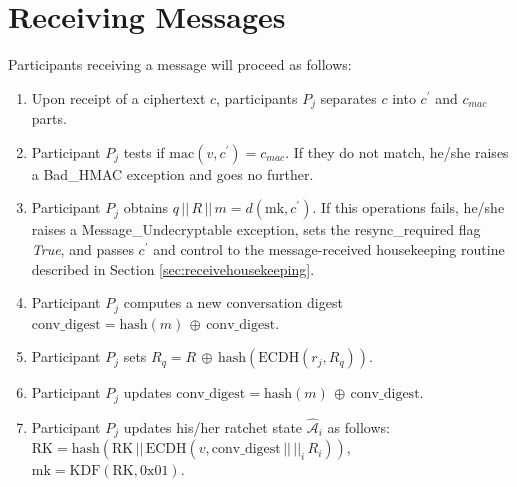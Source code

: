 \documentclass[%
preprint,
amsmath,amssymb,
aps,
prb,
floatfix,
]{revtex4-1}
\begin{document}
\section{\label{sec:receiving}Receiving Messages}
Participants receiving a message will proceed as follows:
\begin{enumerate}
\item Upon receipt of a ciphertext $c$, participants $P_j$ separates $c$ into
$c^\prime$ and $c_{mac}$ parts.
\item Participant $P_j$ tests if $\mathrm{mac}(v, c^\prime) = c_{mac}$. If
they do not match, he/she raises a Bad\_HMAC exception and goes no further.
\item Participant $P_j$ obtains $q \, || \, R \, || \, m =
d(\mathrm{mk}, c^\prime)$.
If this operations fails, he/she raises a Message\_Undecryptable
exception, sets the resync\_required flag \textit{True},
and passes $c^\prime$ and control to the message-received housekeeping routine described in
Section \ref{sec:receivehousekeeping}.
\item Participant $P_j$ computes a new conversation digest
$\mathrm{conv\_digest} = \mathrm{hash}(m) \, \oplus \, \mathrm{conv\_digest}$.
\item Participant $P_j$ sets $R_q = R \, \oplus \,
\mathrm{hash}(\mathrm{ECDH}(r_j, R_q))$.
\item Participant $P_j$ updates $\mathrm{conv\_digest} = \mathrm{hash}(m) \, \oplus \, \mathrm{conv\_digest}$.
\item Participant $P_j$ updates his/her ratchet state $\mathcal{\hat{A}}_i$ as
follows: \\
$\mathrm{RK} = \mathrm{hash}(\mathrm{RK} \, || \, \mathrm{ECDH}(v,
\mathrm{conv\_digest} \, || \, ||_i \, R_i))$, \\
$\mathrm{mk} = \mathrm{KDF}(\mathrm{RK}, 0\mathrm{x}01)$.

\end{enumerate}
\end{document}
